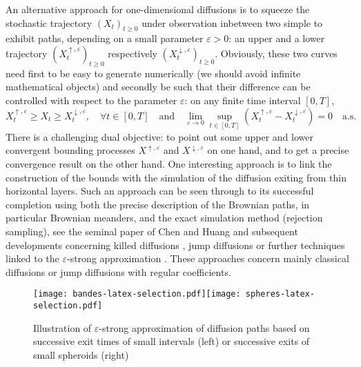 \documentclass[12pt]{article}
\numberwithin{equation}{section}
\begin{document}
An alternative approach for one-dimensional diffusions is to squeeze the stochastic trajectory $(X_t)_{t\ge 0}$ under observation inbetween two simple to exhibit paths, depending on a small parameter $\varepsilon>0$: an upper and a lower trajectory $(X_t^{\uparrow,\varepsilon})_{t\ge 0}$ respectively  $(X_t^{\downarrow,\varepsilon})_{t\ge 0}$.  Obviously, these two curves need first to be easy to generate numerically (we should avoid infinite mathematical objects) and secondly be such that their difference can be controlled with respect to the parameter $\varepsilon$: on any finite time interval $[0,T]$,
\[
X_t^{\uparrow,\varepsilon}\ge X_t\ge X_t^{\downarrow,\varepsilon},\quad \forall t\in [0,T]\quad \mbox{and}\quad \lim_{\varepsilon\to 0}\sup_{t\in [0,T] }(X_t^{\uparrow,\varepsilon}-X_t^{\downarrow,\varepsilon})=0\quad \mbox{a.s.}
\]
There is a challenging dual objective: to point out some upper and lower convergent bounding processes $X^{\uparrow,\varepsilon}$ and $X^{\downarrow,\varepsilon}$ on one hand, and to get a precise convergence result on the other hand. One interesting approach is to link the construction of the bounds with the simulation of the diffusion exiting from thin horizontal layers. Such an approach can be seen through to its successful completion using both the precise description of the Brownian paths, in particular Brownian meanders, and the exact simulation method (rejection sampling), see the seminal paper of Chen and Huang \cite{chen2013localization} and subsequent developments concerning killed diffusions \cite{casella2008exact}, jump diffusions \cite{giesecke2013exact} or further techniques linked to the $\varepsilon$-strong approximation \cite{pollock2016exact}. 
These approaches concern mainly classical diffusions or jump diffusions with regular coefficients. 

\begin{figure}[h]
\centering
\texttt{[image: bandes-latex-selection.pdf]}\hspace*{-0.5cm}\texttt{[image: spheres-latex-selection.pdf]}
\caption{\small {Illustration of $\varepsilon$-strong approximation of diffusion paths based on successive exit times of small intervals (left)
or successive exits of small spheroids (right)}}
\label{fig:my_label0}
\end{figure}
\end{document}
